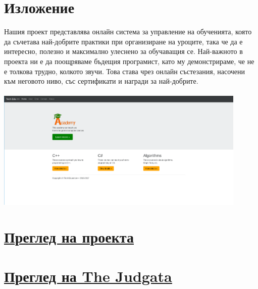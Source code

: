 \documentclass[12pt]{article}
\begin{document}
	\section{Изложение}
	Нашия проект представлява онлайн система за управление на обученията, която да съчетава най-добрите практики при организиране на уроците, така че да е интересно, полезно и максимално улеснено за обучаващия се. Най-важното в проекта ни е да поощряваме бъдещия програмист, като му демонстрираме, че не е толкова трудно, колкото звучи. Това става чрез онлайн състезания, насочени към неговото ниво, със сертификати и награди за най-добрите. \\\vspace {3cm} \\
	\includegraphics[width=0.9\textwidth]{academy} \\
	\section{\underline{\href{https://infocourse.techedu.cf}{Преглед на проекта}}}
	\section{\underline{\href{https://judge.techedu.cf}{Преглед на The Judgata}}}
	\newpage
\end{document}
